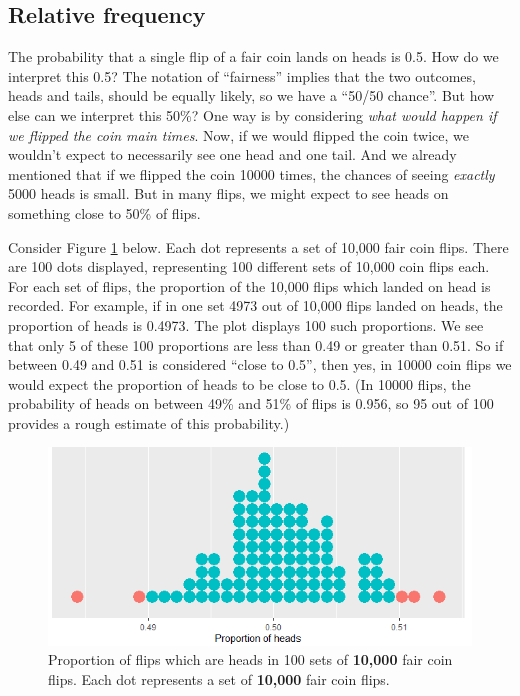 \documentclass[
]{book}
\theoremstyle{definition}
\theoremstyle{definition}
\theoremstyle{definition}
\theoremstyle{remark}
\begin{document}
\hypertarget{rel-freq}{%
\subsection{Relative frequency}\label{rel-freq}}

The probability that a single flip of a fair coin lands on heads is 0.5. How do we interpret this 0.5? The notation of ``fairness'' implies that the two outcomes, heads and tails, should be equally likely, so we have a ``50/50 chance''. But how else can we interpret this 50\%? One way is by considering \emph{what would happen if we flipped the coin main times}. Now, if we would flipped the coin twice, we wouldn't expect to necessarily see one head and one tail. And we already mentioned that if we flipped the coin 10000 times, the chances of seeing \emph{exactly} 5000 heads is small. But in many flips, we might expect to see heads on something close to 50\% of flips.

Consider Figure \ref{fig:coin-sim1} below. Each dot represents a set of 10,000 fair coin flips. There are 100 dots displayed, representing 100 different sets of 10,000 coin flips each. For each set of flips, the proportion of the 10,000 flips which landed on head is recorded. For example, if in one set 4973 out of 10,000 flips landed on heads, the proportion of heads is 0.4973. The plot displays 100 such proportions. We see that only 5 of these 100 proportions are less than 0.49 or greater than 0.51. So if between 0.49 and 0.51 is considered ``close to 0.5'', then yes, in 10000 coin flips we would expect the proportion of heads to be close to 0.5. (In 10000 flips, the probability of heads on between 49\% and 51\% of flips is 0.956, so 95 out of 100 provides a rough estimate of this probability.)



\begin{figure}
\includegraphics[width=8.65in]{_graphics/coin-sim1} \caption{Proportion of flips which are heads in 100 sets of \textbf{10,000} fair coin flips. Each dot represents a set of \textbf{10,000} fair coin flips.}\label{fig:coin-sim1}
\end{figure}
\end{document}
